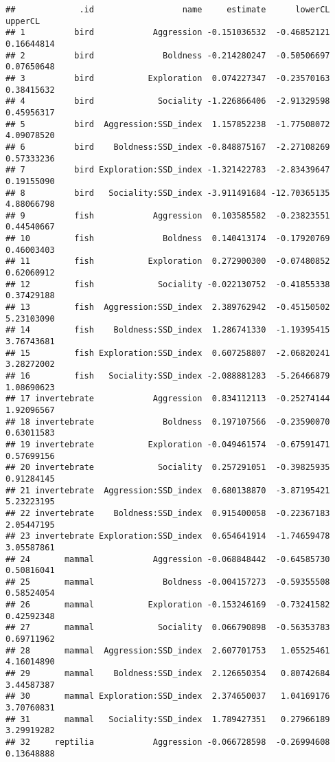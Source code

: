\documentclass[]{article}
\begin{document}
\begin{verbatim}
##             .id                  name     estimate      lowerCL    upperCL
## 1          bird            Aggression -0.151036532  -0.46852121 0.16644814
## 2          bird              Boldness -0.214280247  -0.50506697 0.07650648
## 3          bird           Exploration  0.074227347  -0.23570163 0.38415632
## 4          bird             Sociality -1.226866406  -2.91329598 0.45956317
## 5          bird  Aggression:SSD_index  1.157852238  -1.77508072 4.09078520
## 6          bird    Boldness:SSD_index -0.848875167  -2.27108269 0.57333236
## 7          bird Exploration:SSD_index -1.321422783  -2.83439647 0.19155090
## 8          bird   Sociality:SSD_index -3.911491684 -12.70365135 4.88066798
## 9          fish            Aggression  0.103585582  -0.23823551 0.44540667
## 10         fish              Boldness  0.140413174  -0.17920769 0.46003403
## 11         fish           Exploration  0.272900300  -0.07480852 0.62060912
## 12         fish             Sociality -0.022130752  -0.41855338 0.37429188
## 13         fish  Aggression:SSD_index  2.389762942  -0.45150502 5.23103090
## 14         fish    Boldness:SSD_index  1.286741330  -1.19395415 3.76743681
## 15         fish Exploration:SSD_index  0.607258807  -2.06820241 3.28272002
## 16         fish   Sociality:SSD_index -2.088881283  -5.26466879 1.08690623
## 17 invertebrate            Aggression  0.834112113  -0.25274144 1.92096567
## 18 invertebrate              Boldness  0.197107566  -0.23590070 0.63011583
## 19 invertebrate           Exploration -0.049461574  -0.67591471 0.57699156
## 20 invertebrate             Sociality  0.257291051  -0.39825935 0.91284145
## 21 invertebrate  Aggression:SSD_index  0.680138870  -3.87195421 5.23223195
## 22 invertebrate    Boldness:SSD_index  0.915400058  -0.22367183 2.05447195
## 23 invertebrate Exploration:SSD_index  0.654641914  -1.74659478 3.05587861
## 24       mammal            Aggression -0.068848442  -0.64585730 0.50816041
## 25       mammal              Boldness -0.004157273  -0.59355508 0.58524054
## 26       mammal           Exploration -0.153246169  -0.73241582 0.42592348
## 27       mammal             Sociality  0.066790898  -0.56353783 0.69711962
## 28       mammal  Aggression:SSD_index  2.607701753   1.05525461 4.16014890
## 29       mammal    Boldness:SSD_index  2.126650354   0.80742684 3.44587387
## 30       mammal Exploration:SSD_index  2.374650037   1.04169176 3.70760831
## 31       mammal   Sociality:SSD_index  1.789427351   0.27966189 3.29919282
## 32     reptilia            Aggression -0.066728598  -0.26994608 0.13648888

\end{verbatim}
\end{document}
